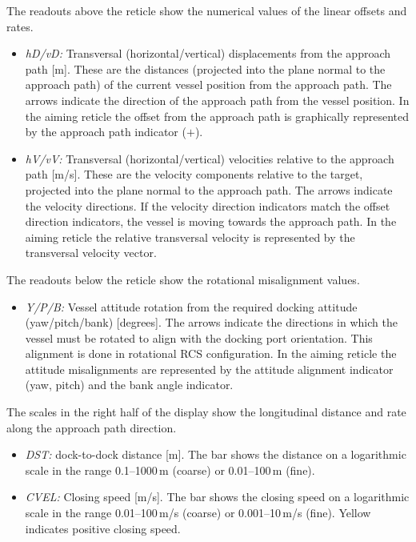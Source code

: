 \documentclass[Orbiter User Manual.tex]{subfiles}
\begin{document}
The readouts above the reticle show the numerical values of the linear offsets
and rates.

\begin{itemize}
	\item \emph{hD/vD:} Transversal (horizontal/vertical) displacements from the
		approach path [m]. These are the distances (projected into the plane
		normal to the approach path) of the current vessel position from the
		approach path. The arrows indicate the direction of the approach path
		from the vessel position. In the aiming reticle the offset from the
		approach path is graphically represented by the approach path indicator
		($+$).
	\item \emph{hV/vV:} Transversal (horizontal/vertical) velocities relative to
		the approach path [m/s]. These are the velocity components relative to
		the target, projected into the plane normal to the approach path. The
		arrows indicate the velocity directions. If the velocity direction
		indicators match the offset direction indicators, the vessel is moving
		towards the approach path. In the aiming reticle the relative
		transversal velocity is represented by the transversal velocity vector.
\end{itemize}

The readouts below the reticle show the rotational misalignment values.

\begin{itemize}
	\item \emph{Y/P/B:} Vessel attitude rotation from the required docking
		attitude (yaw/pitch/bank) [degrees]. The arrows indicate the directions
		in which the vessel must be rotated to align with the docking port
		orientation. This alignment is done in rotational RCS configuration. In
		the aiming reticle the attitude misalignments are represented by the
		attitude alignment indicator (yaw, pitch) and the bank angle
		indicator.
\end{itemize}

The scales in the right half of the display show the longitudinal distance and
rate along the approach path direction.

\begin{itemize}
	\item \emph{DST:} dock-to-dock distance [m]. The bar shows the distance on a
		logarithmic scale in the range 0.1--1000\,m (coarse) or 0.01--100\,m
		(fine).
	\item \emph{CVEL:} Closing speed [m/s]. The bar shows the closing speed on a
		logarithmic scale in the range 0.01--100\,m/s (coarse) or 0.001--10\,m/s
		(fine). Yellow indicates positive closing speed.
\end{itemize}
\end{document}
